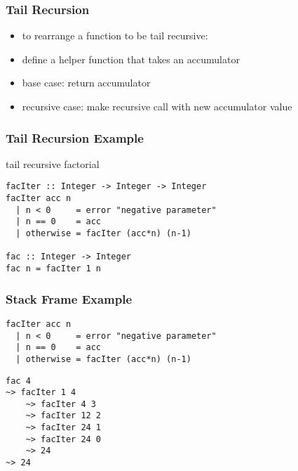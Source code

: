 \documentclass[dvipsnames]{beamer}
\theoremstyle{plain}
\begin{document}
\begin{frame}
  \frametitle{Tail Recursion}

  \begin{itemize}
    \item to rearrange a function to be tail recursive:

    \medskip
    \item define a helper function that takes an \alert{accumulator}
    \item base case: return accumulator
    \item recursive case: make recursive call with new accumulator value
  \end{itemize}
\end{frame}

\begin{frame}[fragile]
  \frametitle{Tail Recursion Example}

  \begin{exampleblock}{tail recursive factorial}
    \begin{lstlisting}
facIter :: Integer -> Integer -> Integer
facIter acc n
  | n < 0     = error "negative parameter"
  | n == 0    = acc
  | otherwise = facIter (acc*n) (n-1)

fac :: Integer -> Integer
fac n = facIter 1 n
    \end{lstlisting}
  \end{exampleblock}
\end{frame}

\begin{frame}[fragile]
  \frametitle{Stack Frame Example}

  \begin{lstlisting}
facIter acc n
  | n < 0     = error "negative parameter"
  | n == 0    = acc
  | otherwise = facIter (acc*n) (n-1)
  \end{lstlisting}

  \lstinline{fac 4}\\
  \lstinline{~> facIter 1 4}\\
  \lstinline{    ~> facIter 4 3}\\
  \lstinline{    ~> facIter 12 2}\\
  \lstinline{    ~> facIter 24 1}\\
  \lstinline{    ~> facIter 24 0}\\
  \lstinline{    ~> 24}\\
  \lstinline{~> 24}\\
\end{frame}
\end{document}
